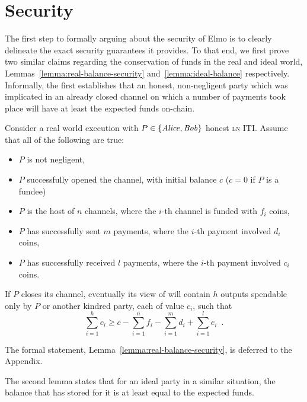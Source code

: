 \section{Security}
  \label{section:security}
  The first step to formally arguing about the security of Elmo is to
  clearly delineate the exact security guarantees it provides. To that end, we
  first prove two similar claims regarding the conservation of funds in the real
  and ideal world, Lemmas~\ref{lemma:real-balance-security}
  and~\ref{lemma:ideal-balance} respectively. Informally, the first establishes that
  an honest, non-negligent party which was implicated in an already closed
  channel on which a number of payments took place will have at least the
  expected funds on-chain.

\begin{lemma}
\label{lemma:real-balance-security-informal}
  Consider a real world execution with $P \in \{\mathit{Alice}, \mathit{Bob}\}$ honest
  \textsc{ln} ITI. Assume that all of the following are true:
  \begin{itemize}
    \item $P$ is not negligent,
    \item $P$ successfully opened the channel, with initial balance $c$ ($c = 0$
    if $P$ is a fundee)
    \item $P$ is the host of $n$ channels, where the $i$-th channel is funded
    with $f_i$ coins,
    \item $P$ has successfully sent $m$ payments, where the $i$-th payment
    involved $d_i$ coins,
    \item $P$ has successfully received $l$ payments, where the $i$-th payment
    involved $c_i$ coins.
  \end{itemize}
  If $P$ closes its channel, eventually its view of \ledger will contain $h$
  outputs spendable only by $P$ or another kindred party, each of value $c_i$,
  such that
  \begin{equation}
    \sum\limits_{i=1}^h c_i \geq c - \sum\limits_{i=1}^n f_i -
    \sum\limits_{i=1}^m d_i + \sum\limits_{i=1}^l e_i \enspace.
  \end{equation}
\end{lemma}
The formal statement, Lemma~\ref{lemma:real-balance-security}, is deferred to
the Appendix.

  The second lemma states that for an ideal party in a
  similar situation, the balance that \fchan has stored for it is at least equal
  to the expected funds.

